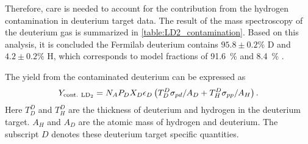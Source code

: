 \documentclass[../main.tex]{subfiles}
\begin{document}
Therefore, care is needed to account for the contribution from the hydrogen contamination in deuterium
target data. The result of the mass spectroscopy of the deuterium gas \cite{paul-1893} is
summarized in \cref{table:LD2_contamination}. Based on this analysis, it is concluded the Fermilab
deuterium contains $95.8\pm0.2\%$ D and $4.2\pm0.2\%$ H,
which corresponds to model fractions of \SI{91.6}{\percent}  and \SI{8.4}{\percent} .

The yield from the contaminated deuterium can be expressed as
\begin{equation}
	Y_{\mathrm{cont.~\ce{LD_2}}} = N_A P_D X_D \epsilon_D \left( T_D^D \sigma_{pd}/A_D + T^D_H \sigma_{pp}/A_H   \right).
\end{equation}
Here $T_D^D$ and $T^D_H$ are the thickness of deuterium and hydrogen in the deuterium target.
$A_H$ and $A_D$ are the atomic mass of hydrogen and deuterium.
The subscript $D$ denotes these deuterium target specific quantities.
\end{document}
